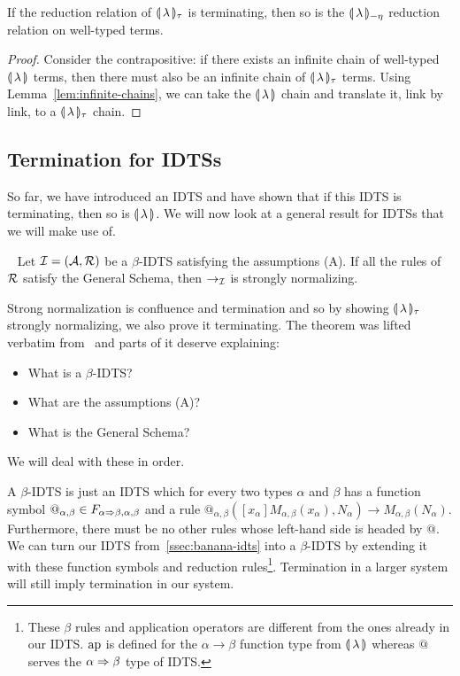 \begin{lemma}\label{lem:banana-tau-termination}
  If the reduction relation of $\llparenthesis \, \lambda \, \rrparenthesis_\tau$ is terminating, then
  so is the ${\llparenthesis \, \lambda \, \rrparenthesis_{-\eta}}$ reduction relation on well-typed terms.
\end{lemma}

\begin{proof}
  Consider the contrapositive: if there exists an infinite chain of
  well-typed $\llparenthesis \, \lambda \, \rrparenthesis$ terms, then there must also be an infinite
  chain of $\llparenthesis \, \lambda \, \rrparenthesis_\tau$ terms. Using
  Lemma~\ref{lem:infinite-chains}, we can take the $\llparenthesis \, \lambda \, \rrparenthesis$ chain
  and translate it, link by link, to a $\llparenthesis \, \lambda \, \rrparenthesis_\tau$ chain.
\end{proof}


\subsection{Termination for IDTSs}
\label{ssec:termination-for-idts}

So far, we have introduced an IDTS and have shown that if this IDTS is
terminating, then so is $\llparenthesis \, \lambda \, \rrparenthesis$. We will now look at a general result
for IDTSs that we will make use of.

\begin{theorem}
  \label{thm:idts-normalization}
  ~\cite{blanqui2000termination} Let
  $\mathcal{I} = (\mathcal{A}, \mathcal{R})$ be a $\beta$-IDTS satisfying the assumptions (A). If
  all the rules of $\mathcal{R}$ satisfy the General Schema, then $\to_{\mathcal{I}}$ is
  strongly normalizing.
\end{theorem}

Strong normalization is confluence and termination and so by showing
$\llparenthesis \, \lambda \, \rrparenthesis_\tau$ strongly normalizing, we also prove it
terminating. The theorem was lifted verbatim
from~\cite{blanqui2000termination} and parts of it deserve explaining:

\begin{itemize}
\item What is a $\beta$-IDTS?
\item What are the assumptions (A)?
\item What is the General Schema?
\end{itemize}

We will deal with these in order.

A $\beta$-IDTS is just an IDTS which for every two types $\alpha$ and
$\beta$ has a function symbol
$@_{\alpha,\beta} \in F_{\alpha \Rightarrow \beta,\alpha,\beta}$ and a rule
$@_{\alpha,\beta}([x_\alpha] M_{\alpha, \beta}(x_\alpha), N_\alpha) \to
M_{\alpha,\beta}(N_\alpha)$. Furthermore, there must be no other rules
whose left-hand side is headed by $@$. We can turn our IDTS
from~\ref{ssec:banana-idts} into a $\beta$-IDTS by extending it with these
function symbols and reduction rules\footnote{These $\beta$ rules and
  application operators are different from the ones already in our
  IDTS. $\operatorname{ap}$ is defined for the $\alpha \to \beta$ function type from
  $\llparenthesis \, \lambda \, \rrparenthesis$ whereas $@$ serves the $\alpha \Rightarrow \beta$ type of
  IDTS.}. Termination in a larger system will still imply termination in
our system.

